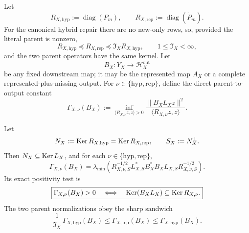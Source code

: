 Let
\begin{equation}
 R_{X,\mathrm{hyp}}:=\operatorname{diag}(P_m),
 \qquad
 R_{X,\mathrm{rep}}:=\operatorname{diag}(\widetilde P_m).
 \label{eq:tpc65-two-parent-operators}
\end{equation}
For the canonical hybrid repair there are no new-only rows, so, provided
the literal parent is nonzero,
\begin{equation}
 R_{X,\mathrm{hyp}}
 \preceq R_{X,\mathrm{rep}}
 \preceq\mathfrak I_XR_{X,\mathrm{hyp}},
 \qquad
 1\le\mathfrak I_X<\infty,
 \label{eq:tpc65-parent-operator-order}
\end{equation}
and the two parent operators have the same kernel.  Let
\[
 B_X:Y_X\longrightarrow\mathcal H_X^{\mathrm{out}}
\]
be any fixed downstream map; it may be the represented map \(A_X\) or a
complete represented-plus-missing output.  For
\(\nu\in\{\mathrm{hyp},\mathrm{rep}\}\), define the direct parent-to-output
constant
\begin{equation}
 \Gamma_{X,\nu}(B_X)
 :=
 \inf_{\langle R_{X,\nu}z,z\rangle>0}
 \frac{\|B_XL_Xz\|^2}
      {\langle R_{X,\nu}z,z\rangle}.
 \label{eq:tpc65-direct-closure-constant}
\end{equation}

\begin{theorem}
\label{thm:tpc65-direct-repair-covariance}
Let
\[
 N_X:=\operatorname{Ker} R_{X,\mathrm{hyp}}
     =\operatorname{Ker} R_{X,\mathrm{rep}},
 \qquad
 S_X:=N_X^\perp.
\]
Then \(N_X\subseteq\operatorname{Ker} L_X\), and for each
\(\nu\in\{\mathrm{hyp},\mathrm{rep}\}\),
\begin{equation}
 \boxed{
 \Gamma_{X,\nu}(B_X)
 =
 \lambda_{\min}\!\left(
 R_{X,\nu,S}^{-1/2}
 L_{X,S}^*B_X^*B_XL_{X,S}
 R_{X,\nu,S}^{-1/2}
 \right).}
 \label{eq:tpc65-direct-generalized-gram}
\end{equation}
Its exact positivity test is
\begin{equation}
 \boxed{
 \Gamma_{X,\nu}(B_X)>0
 \quad\Longleftrightarrow\quad
 \operatorname{Ker}(B_XL_X)\subseteq\operatorname{Ker} R_{X,\nu}.}
 \label{eq:tpc65-direct-kernel-test}
\end{equation}
The two parent normalizations obey the sharp sandwich
\begin{equation}
 \boxed{
 \frac{1}{\mathfrak I_X}\,
 \Gamma_{X,\mathrm{hyp}}(B_X)
 \le
 \Gamma_{X,\mathrm{rep}}(B_X)
 \le
 \Gamma_{X,\mathrm{hyp}}(B_X).}
 \label{eq:tpc65-direct-repair-sandwich}
\end{equation}
\end{theorem}

